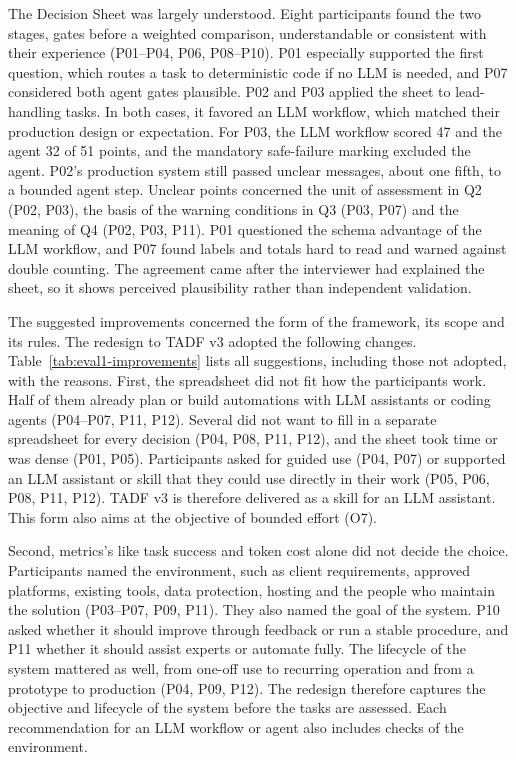 The Decision Sheet was largely understood. Eight participants found the two stages, gates before a weighted comparison, understandable or consistent with their experience (P01--P04, P06, P08--P10). P01 especially supported the first question, which routes a task to deterministic code if no LLM is needed, and P07 considered both agent gates plausible. P02 and P03 applied the sheet to lead-handling tasks. In both cases, it favored an LLM workflow, which matched their production design or expectation. For P03, the LLM workflow scored 47 and the agent 32 of 51 points, and the mandatory safe-failure marking excluded the agent. P02's production system still passed unclear messages, about one fifth, to a bounded agent step. Unclear points concerned the unit of assessment in Q2 (P02, P03), the basis of the warning conditions in Q3 (P03, P07) and the meaning of Q4 (P02, P03, P11). P01 questioned the schema advantage of the LLM workflow, and P07 found labels and totals hard to read and warned against double counting. The agreement came after the interviewer had explained the sheet, so it shows perceived plausibility rather than independent validation.

The suggested improvements concerned the form of the framework, its scope and its rules. The redesign to TADF v3 adopted the following changes. Table~\ref{tab:eval1-improvements} lists all suggestions, including those not adopted, with the reasons. First, the spreadsheet did not fit how the participants work. Half of them already plan or build automations with LLM assistants or coding agents (P04--P07, P11, P12). Several did not want to fill in a separate spreadsheet for every decision (P04, P08, P11, P12), and the sheet took time or was dense (P01, P05). Participants asked for guided use (P04, P07) or supported an LLM assistant or skill that they could use directly in their work (P05, P06, P08, P11, P12). TADF v3 is therefore delivered as a skill for an LLM assistant. This form also aims at the objective of bounded effort (O7).

Second, metrics’s like task success and token cost alone did not decide the choice. Participants named the environment, such as client requirements, approved platforms, existing tools, data protection, hosting and the people who maintain the solution (P03--P07, P09, P11). They also named the goal of the system. P10 asked whether it should improve through feedback or run a stable procedure, and P11 whether it should assist experts or automate fully. The lifecycle of the system mattered as well, from one-off use to recurring operation and from a prototype to production (P04, P09, P12). The redesign therefore captures the objective and lifecycle of the system before the tasks are assessed. Each recommendation for an LLM workflow or agent also includes checks of the environment.

